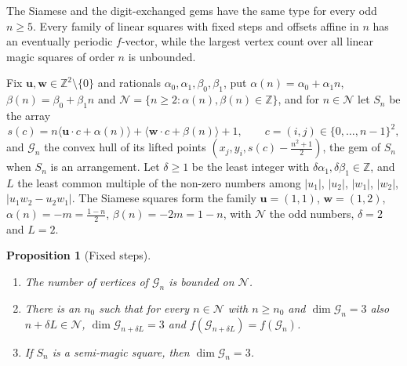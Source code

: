 \documentclass[11pt,a4paper]{article}
\theoremstyle{plain}
\newtheorem{proposition}[theorem]{Proposition}
\theoremstyle{definition}
\theoremstyle{remark}
\newcommand{\Z}{\mathbb{Z}}
\begin{document}
The Siamese and the digit-exchanged gems have the same type for every odd $n\ge5$.
Every family of linear squares with fixed steps and offsets affine in $n$ has an eventually periodic $f$-vector, while the largest vertex count over all linear magic squares of order $n$ is unbounded.

Fix $\mathbf u,\mathbf w\in\Z^2\setminus\{0\}$ and rationals $\alpha_0,\alpha_1,\beta_0,\beta_1$, put $\alpha(n)=\alpha_0+\alpha_1n$, $\beta(n)=\beta_0+\beta_1n$ and $\mathcal N=\{n\ge2:\alpha(n),\beta(n)\in\Z\}$, and for $n\in\mathcal N$ let $S_n$ be the array
\[
s(c)=n\langle\mathbf u\cdot c+\alpha(n)\rangle+\langle\mathbf w\cdot c+\beta(n)\rangle+1,\qquad c=(i,j)\in\{0,\dots,n-1\}^2,
\]
and $\mathcal G_n$ the convex hull of its lifted points $(x_j,y_i,s(c)-\frac{n^2+1}2)$, the gem of $S_n$ when $S_n$ is an arrangement.
Let $\delta\ge1$ be the least integer with $\delta\alpha_1,\delta\beta_1\in\Z$, and $L$ the least common multiple of the non-zero numbers among $|u_1|$, $|u_2|$, $|w_1|$, $|w_2|$, $|u_1w_2-u_2w_1|$.
The Siamese squares form the family $\mathbf u=(1,1)$, $\mathbf w=(1,2)$, $\alpha(n)=-m=\frac{1-n}2$, $\beta(n)=-2m=1-n$, with $\mathcal N$ the odd numbers, $\delta=2$ and $L=2$.

\begin{proposition}[Fixed steps]
\label{prop:fixed-steps}
\begin{enumerate}
\item[(a)] The number of vertices of $\mathcal G_n$ is bounded on $\mathcal N$.
\item[(b)] There is an $n_0$ such that for every $n\in\mathcal N$ with $n\ge n_0$ and $\dim\mathcal G_n=3$ also $n+\delta L\in\mathcal N$, $\dim\mathcal G_{n+\delta L}=3$ and $f(\mathcal G_{n+\delta L})=f(\mathcal G_n)$.
\item[(c)] If $S_n$ is a semi-magic square, then $\dim\mathcal G_n=3$.
\end{enumerate}
\end{proposition}
\end{document}

